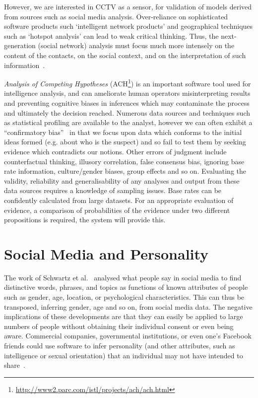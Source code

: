 \documentclass[conference]{IEEEtran}
\begin{document}
However, we are interested in CCTV as a sensor, for validation of
models derived from sources such as social media
analysis. Over-reliance on sophisticated software products such
`intelligent network products' and geographical techniques such as
`hotspot analysis' can lead to weak critical thinking. Thus, the
next-generation (social network) analysis must focus much more
intensely on the content of the contacts, on the social context, and
on the interpretation of such information~\cite{klerks:2001}.

{\emph{Analysis of Competing Hypotheses}}
(ACH\footnote{\url{http://www2.parc.com/istl/projects/ach/ach.html}})
is an important software tool used for intelligence analysis, and can
ameliorate human operators misinterpreting results and preventing
cognitive biases in inferences which may contaminate the process and
ultimately the decision reached. Numerous data sources and techniques
such as statistical profiling are available to the analyst, however we
can often exhibit a ``confirmatory
bias''~\cite{lipton:2002,lipton:2005} in that we focus upon data which
conforms to the initial ideas formed (e.g. about who is the suspect)
and so fail to test them by seeking evidence which contradicts our
notions. Other errors of judgment include counterfactual thinking,
illusory correlation, false consensus bias, ignoring base rate
information, culture/gender biases, group effects and so
on. Evaluating the validity, reliability and generalisability of any
analyses and output from these data sources requires a knowledge of
sampling issues. Base rates can be confidently calculated from large
datasets. For an appropriate evaluation of evidence, a comparison of
probabilities of the evidence under two different propositions is
required, the system will provide this.

\section{Social Media and Personality}\label{socmed+pers}

The work of Schwartz et al.~\cite{schwartz-et-al:2013} analysed what
people say in social media to find distinctive words, phrases, and
topics as functions of known attributes of people such as gender, age,
location, or psychological characteristics. This can thus be
transposed, inferring gender, age and so on, from social media
data. The negative implications of these developments are that they
can easily be applied to large numbers of people without obtaining
their individual consent or even being aware. Commercial companies,
governmental institutions, or even one’s Facebook friends could use
software to infer personality (and other attributes, such as
intelligence or sexual orientation) that an individual may not have
intended to share~\cite{lambiotte+kosinski:2014}.
\end{document}
